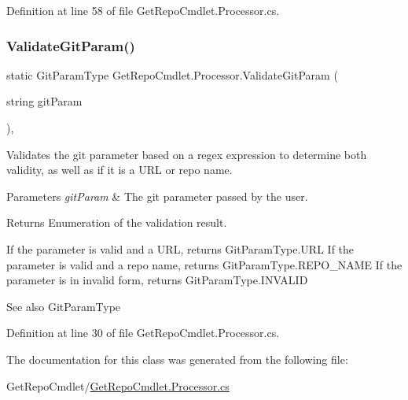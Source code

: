 Definition at line 58 of file Get\+Repo\+Cmdlet.\+Processor.\+cs.

\mbox{\label{class_get_repo_cmdlet_1_1_processor_a0fba012ba15720a0fcd419c44b757c5b}} 
\subsubsection{\texorpdfstring{Validate\+Git\+Param()}{ValidateGitParam()}}
{\footnotesize\ttfamily static Git\+Param\+Type Get\+Repo\+Cmdlet.\+Processor.\+Validate\+Git\+Param (\begin{DoxyParamCaption}\item[{string}]{git\+Param }\end{DoxyParamCaption})\hspace{0.3cm}{\ttfamily [static]}, {\ttfamily [package]}}



Validates the git parameter based on a regex expression to determine both validity, as well as if it is a U\+RL or repo name. 


\begin{DoxyParams}{Parameters}
{\em git\+Param} & The git parameter passed by the user.\\
\hline
\end{DoxyParams}
\begin{DoxyReturn}{Returns}
Enumeration of the validation result. 
\end{DoxyReturn}


If the parameter is valid and a U\+RL, returns Git\+Param\+Type.\+U\+RL If the parameter is valid and a repo name, returns Git\+Param\+Type.\+R\+E\+P\+O\+\_\+\+N\+A\+ME If the parameter is in invalid form, returns Git\+Param\+Type.\+I\+N\+V\+A\+L\+ID 

\begin{DoxySeeAlso}{See also}
Git\+Param\+Type


\end{DoxySeeAlso}


Definition at line 30 of file Get\+Repo\+Cmdlet.\+Processor.\+cs.



The documentation for this class was generated from the following file\+:\begin{DoxyCompactItemize}
\item 
Get\+Repo\+Cmdlet/\mbox{\hyperlink{_get_repo_cmdlet_8_processor_8cs}{Get\+Repo\+Cmdlet.\+Processor.\+cs}}\end{DoxyCompactItemize}
